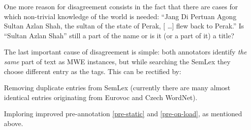 One more reason for disagreement consists in the fact that there are cases for which non-trivial knowledge of the world is needed: ``Jang Di Pertuan Agong Sultan Azlan Shah, the sultan of the state of Perak, [\kern 2pt \ldots] flew back to Perak.'' Is ``Sultan Azlan Shah'' still a part of the name or is it (or a part of it) a title?

The last important cause of disagreement is simple: both annotators identify \emph{the same} part of text as MWE instances, but while searching the SemLex they choose different entry as the tags. This can be rectified by:
	\begin{compactitem}
		\item Removing duplicate entries from SemLex (currently there are many almost identical entries originating from Eurovoc and Czech WordNet).
		\item Imploring improved pre-annotation \ref{pre-static} and \ref{pre-on-load}, as mentioned above.
	\end{compactitem}



